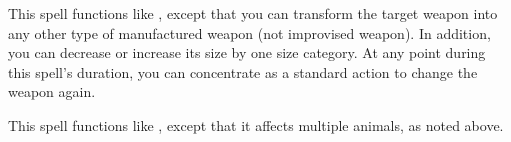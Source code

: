 \begin{spelleffect}
    This spell functions like , except that you can transform the target weapon into any other type of manufactured weapon (not improvised weapon). In addition, you can decrease or increase its size by one size category. At any point during this spell's duration, you can concentrate as a standard action to change the weapon again.
\end{spelleffect}

\spellrng{\rngmed}
\begin{spelleffect}
  This spell functions like , except that it affects multiple animals, as noted above.
\end{spelleffect}

\begin{comment}
\spellsection{Animate Objects}
\spelldesc{You imbue inanimate objects with mobility and a semblance of life.}
\spellschool{Transmutation (Animation)}
\spelllvl{Chaos 5, Trans 5}
\spellrng{\rngmed}
\spellarea{\areamed radius limit}
\spelltgts{One Small object/level within the area; see text}
\spelldur{\durshort}
\spellsave{None}
\spellsr{No}
\begin{spelleffect}
  Each animated object immediately attacks whomever or whatever you initially designate. Your control of the objects is limited to simple commands (``Attack,'' ``Defend,'' ``Stop,'' and so forth).
  \par An animated object can be of any nonmagical material. You may animate one Small or smaller object or an equivalent number of larger objects per caster level. A Medium object counts as two Small or smaller objects, a Large object as four, a Huge object as eight, a Gargantuan object as sixteen, and a Colossal object as thirty-two. You can give the objects new commands as a move action, as normal for directing an active spell.
\end{spelleffect}
\begin{spellnotes}
  This spell cannot animate objects carried or worn by a creature. This spell can be made permanent with a \spell{permanency} ritual.
\end{spellnotes}
\end{comment}

